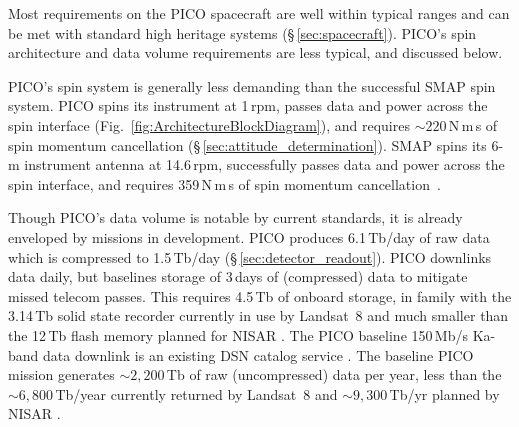 Most requirements on the PICO spacecraft are well within typical
ranges and can be met with standard high heritage systems
(\S\,\ref{sec:spacecraft}). PICO's spin architecture and data volume
requirements are less typical, and discussed below.

PICO's spin system is generally less demanding than the successful
SMAP spin system. PICO spins its instrument at 1\,rpm, passes data and
power across the spin interface (Fig.~\ref{fig:ArchitectureBlockDiagram}), and requires $\sim220$\,N\,m\,s of
spin momentum cancellation (\S\,\ref{sec:attitude_determination}). SMAP spins its 6-m instrument
antenna at 14.6\,rpm, successfully passes data and power across the
spin interface, and requires 359\,N\,m\,s of spin momentum cancellation~\citep{Brown2016}.


Though PICO's data volume is notable by current standards, it is
already enveloped by missions in development. PICO produces
6.1\,Tb/day of raw data which is compressed to 1.5\,Tb/day
(\S\,\ref{sec:detector_readout}). PICO downlinks data daily, but
baselines storage of 3\,days of (compressed) data to mitigate missed
telecom passes. This requires 4.5\,Tb of onboard storage, in family
with the 3.14\,Tb solid state recorder currently in use by Landsat~8
and much smaller than the 12\,Tb flash memory planned for NISAR
\citep{Jasper2017}. The PICO baseline 150\,Mb/s Ka-band data downlink
is an existing DSN catalog service \citep{DSN2015}. The
baseline PICO mission generates $\sim2,200$\,Tb of raw (uncompressed)
data per year, less than the $\sim6,800$\,Tb/year currently returned
by Landsat~8 and $\sim 9,300$\,Tb/yr planned by NISAR
\citep{Jasper2017}.

